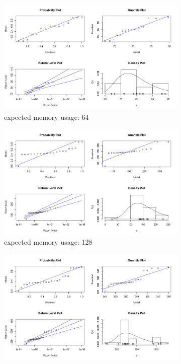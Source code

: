 \documentclass{article}
\begin{document}
\begin{figure}
  \centering
  \begin{subfigure}[t]{0.49\textwidth}
    \centering
    \includegraphics[width=\textwidth]{../plots/memory_fit_64.png}
    \caption{expected memory usage: \SI{64}{\mebi\byte}}
  \end{subfigure}
  \begin{subfigure}[t]{0.49\textwidth}
    \centering
    \includegraphics[width=\textwidth]{../plots/memory_fit_128.png}
    \caption{expected memory usage: \SI{128}{\mebi\byte}}
  \end{subfigure}
  \begin{subfigure}[t]{0.49\textwidth}
    \centering
    \includegraphics[width=\textwidth]{../plots/memory_fit_256.png}

\end{subfigure}
\end{figure}
\end{document}
